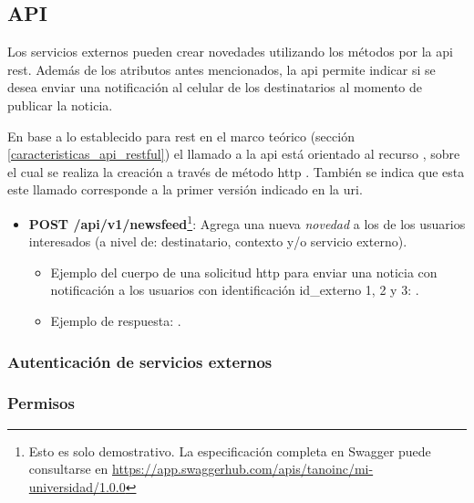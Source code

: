 \subsection{API}
\label{funcionalidad_noticias_api}

Los servicios externos pueden crear novedades utilizando los métodos por la \gls{api} \gls{rest}. 
Además de los atributos antes mencionados, la \gls{api} permite indicar si se desea enviar una notificación  al celular de los destinatarios al momento de publicar la noticia.

En base a lo establecido para \gls{rest} en el marco teórico (sección \ref{caracteristicas_api_restful}) el llamado a la \gls{api} está orientado al recurso , sobre el cual se realiza la creación  a través de método \gls{http} . También se indica que esta este llamado corresponde a la primer versión indicado en la \gls{uri}.

\begin{itemize}
\item \textbf{POST /api/v1/newsfeed}\footnote{Esto es solo demostrativo. La especificación completa en Swagger puede consultarse en \url{https://app.swaggerhub.com/apis/tanoinc/mi-universidad/1.0.0}}: Agrega una nueva \textit{novedad} a los  de los usuarios interesados (a nivel de: destinatario, contexto y/o servicio externo).
\begin{itemize}
\item Ejemplo del cuerpo de una solicitud \gls{http} para enviar una noticia con notificación a los usuarios con identificación id\_externo 1, 2 y 3:
\begingroup
  .\label{codigo_post_newsfeed_solicitud}
\endgroup

\item Ejemplo de respuesta:
\begingroup
  .\label{codigo_post_newsfeed_respuesta}
\endgroup
\end{itemize}
\end{itemize}


\subsubsection{Autenticación de servicios externos}
\label{autenticacion_servicios_externos}

\subsubsection{Permisos}
\label{autenticacion_permisos}